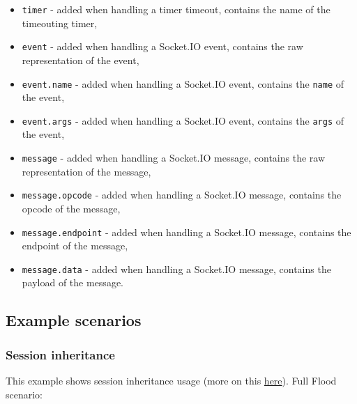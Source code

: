 \documentclass[a4paper]{article}
\begin{document}
\begin{itemize}
\item \texttt{timer} - added when handling a timer timeout, contains the name of the timeouting timer,
\item \texttt{event} - added when handling a Socket.IO event, contains the raw representation of the event,
\item \texttt{event.name} - added when handling a Socket.IO event, contains the \texttt{name} of the event,
\item \texttt{event.args} - added when handling a Socket.IO event, contains the \texttt{args} of the event,
\item \texttt{message} - added when handling a Socket.IO message, contains the raw representation of the message,
\item \texttt{message.opcode} - added when handling a Socket.IO message, contains the opcode of the message,
\item \texttt{message.endpoint} - added when handling a Socket.IO message, contains the endpoint of the message,
\item \texttt{message.data} - added when handling a Socket.IO message, contains the payload of the message.
\end{itemize}
\subsection{Example scenarios}
\label{sec-3-7}
\label{ref-example_scenarios}
\subsubsection{Session inheritance}
\label{sec-3-7-1}

This example shows session inheritance usage (more on this \hyperref[sec-2-2]{here}). Full Flood scenario:
\end{document}

